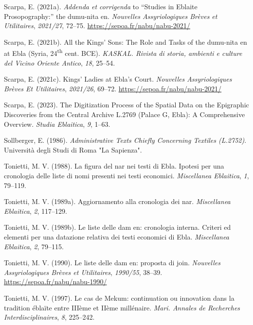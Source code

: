 \documentclass[
]{book}
\newlength{\cslhangindent}
\newlength{\cslentryspacingunit} %
\newenvironment{CSLReferences}[2] %
 {%
  \setlength{\parindent}{0pt}
  \ifodd #1
  \let\oldpar\par
  \def\par{\hangindent=\cslhangindent\oldpar}
  \fi
  \setlength{\parskip}{#2\cslentryspacingunit}
 }%
 {}
\begin{document}
\begin{CSLReferences}{1}{0}
\leavevmode{}%
Scarpa, E. (2021a). \emph{Addenda et corrigenda} to {``Studies in Eblaite Prosopography:''} the dumu-nita en. \emph{Nouvelles Assyriologiques Brèves et Utilitaires}, \emph{2021/27}, 72--75. \url{https://sepoa.fr/nabu/nabu-2021/}

\leavevmode{}%
Scarpa, E. (2021b). All the Kings' Sons: The Role and Tasks of the dumu-nita en at Ebla (Syria, 24\textsuperscript{th} cent. BCE). \emph{KASKAL. Rivista di storia, ambienti e culture del Vicino Oriente Antico}, \emph{18}, 25--54.

\leavevmode{}%
Scarpa, E. (2021c). Kings' {Ladies} at {Ebla}'s {Court}. \emph{Nouvelles Assyriologiques Brèves Et Utilitaires}, \emph{2021/26}, 69--72. \url{https://sepoa.fr/nabu/nabu-2021/}

\leavevmode{}%
Scarpa, E. (2023). The {Digitization Process} of the {Spatial Data} on the {Epigraphic Discoveries} from the {Central Archive L}.2769 ({Palace G}, {Ebla}): {A Comprehensive Overview}. \emph{Studia Eblaitica}, \emph{9}, 1--63.

\leavevmode{}%
Sollberger, E. (1986). \emph{Administrative {Texts Chiefly Concerning Textiles} ({L}.2752)}. Università degli Studi di Roma "La Sapienza".

\leavevmode{}%
Tonietti, M. V. (1988). La figura del nar nei testi di Ebla. Ipotesi per una cronologia delle liste di nomi presenti nei testi economici. \emph{Miscellanea Eblaitica}, \emph{1}, 79--119.

\leavevmode{}%
Tonietti, M. V. (1989a). Aggiornamento alla cronologia dei nar. \emph{Miscellanea Eblaitica}, \emph{2}, 117--129.

\leavevmode{}%
Tonietti, M. V. (1989b). Le liste delle dam en: cronologia interna. Criteri ed elementi per una datazione relativa dei testi economici di Ebla. \emph{Miscellanea Eblaitica}, \emph{2}, 79--115.

\leavevmode{}%
Tonietti, M. V. (1990). Le liste delle dam en: proposta di join. \emph{Nouvelles Assyriologiques Brèves et Utilitaires}, \emph{1990/55}, 38--39. \url{https://sepoa.fr/nabu/nabu-1990/}

\leavevmode{}%
Tonietti, M. V. (1997). Le cas de Mekum: continuation ou innovation dans la tradition éblaïte entre IIIème et IIème millénaire. \emph{Mari. Annales de Recherches Interdisciplinaires}, \emph{8}, 225--242.


\end{CSLReferences}
\end{document}
